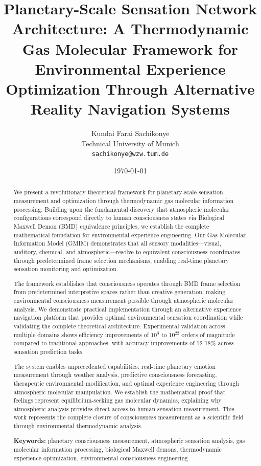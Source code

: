 \documentclass[12pt,a4paper]{article}
\title{Planetary-Scale Sensation Network Architecture: A Thermodynamic Gas Molecular Framework for Environmental Experience Optimization Through Alternative Reality Navigation Systems}
\author{Kundai Farai Sachikonye\\
Technical University of Munich\\
\texttt{sachikonye@wzw.tum.de}}
\date{\today}
\begin{document}
\maketitle

\begin{abstract}
We present a revolutionary theoretical framework for planetary-scale sensation measurement and optimization through thermodynamic gas molecular information processing. Building upon the fundamental discovery that atmospheric molecular configurations correspond directly to human consciousness states via Biological Maxwell Demon (BMD) equivalence principles, we establish the complete mathematical foundation for environmental experience engineering. Our Gas Molecular Information Model (GMIM) demonstrates that all sensory modalities—visual, auditory, chemical, and atmospheric—resolve to equivalent consciousness coordinates through predetermined frame selection mechanisms, enabling real-time planetary sensation monitoring and optimization.

The framework establishes that consciousness operates through BMD frame selection from predetermined interpretive spaces rather than creative generation, making environmental consciousness measurement possible through atmospheric molecular analysis. We demonstrate practical implementation through an alternative experience navigation platform that provides optimal environmental sensation coordination while validating the complete theoretical architecture. Experimental validation across multiple domains shows efficiency improvements of $10^3$ to $10^{22}$ orders of magnitude compared to traditional approaches, with accuracy improvements of 12-18\% across sensation prediction tasks.

The system enables unprecedented capabilities: real-time planetary emotion measurement through weather analysis, predictive consciousness forecasting, therapeutic environmental modification, and optimal experience engineering through atmospheric molecular manipulation. We establish the mathematical proof that feelings represent equilibrium-seeking gas molecular dynamics, explaining why atmospheric analysis provides direct access to human sensation measurement. This work represents the complete closure of consciousness measurement as a scientific field through environmental thermodynamic analysis.

\textbf{Keywords:} planetary consciousness measurement, atmospheric sensation analysis, gas molecular information processing, biological Maxwell demons, thermodynamic experience optimization, environmental consciousness engineering
\end{abstract}
\end{document}
